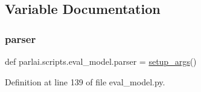 \subsection{Variable Documentation}
\mbox{\label{namespaceparlai_1_1scripts_1_1eval__model_ad0eac535b81763908ecc3cc63c12c885}} 
\subsubsection{\texorpdfstring{parser}{parser}}
{\footnotesize\ttfamily def parlai.\+scripts.\+eval\+\_\+model.\+parser = \hyperlink{namespaceparlai_1_1scripts_1_1eval__model_a2eaba0aa76c4d83e2a0f7f77c23479c8}{setup\+\_\+args}()}



Definition at line 139 of file eval\+\_\+model.\+py.

